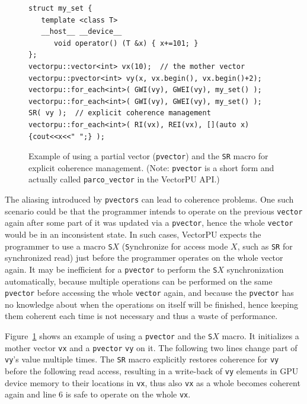 \begin{figure}
\noindent 
\begin{minipage}{\linewidth}
\begin{footnotesize}%
\begin{verbatim}
struct my_set {
   template <class T>
   __host__ __device__
      void operator() (T &x) { x+=101; } 
};
vectorpu::vector<int> vx(10);  // the mother vector
vectorpu::pvector<int> vy(x, vx.begin(), vx.begin()+2);
vectorpu::for_each<int>( GWI(vy), GWEI(vy), my_set() );
vectorpu::for_each<int>( GWI(vy), GWEI(vy), my_set() );
SR( vy );  // explicit coherence management
vectorpu::for_each<int>( RI(vx), REI(vx), [](auto x) {cout<<x<<" ";} );  
\end{verbatim}
\end{footnotesize}
\end{minipage}
\caption{\label{fig:pvector}Example of using a partial vector (\texttt{pvector}) and the \texttt{SR} macro for explicit coherence management. (Note: \texttt{pvector} is a short form and actually called \texttt{parco\_vector} in the VectorPU API.)}
\end{figure}

The aliasing introduced by \texttt{pvectors} can lead to coherence problems. One such scenario could be that the
programmer intends to operate on the previous \texttt{vector} again after
some part of it was updated via a \texttt{pvector}, 
hence the whole \texttt{vector} would be in an inconsistent state.
In such cases, VectorPU expects the programmer to use a macro \texttt{S$X$} (\texttt{S}ynchronize for access mode $X$,
such as \verb.SR. for synchronized read)
just before the programmer operates on the whole vector again.
It may be inefficient for a \texttt{pvector} to perform the \texttt{S$X$} synchronization
automatically, because multiple operations can be performed on the same \texttt{pvector} 
before accessing the whole \texttt{vector} again, 
and because the \texttt{pvector}
has no knowledge about when the operations on itself will be finished, hence
keeping them coherent each time is not necessary and thus a waste of performance.

Figure~\ref{fig:pvector}
shows an example of using a \texttt{pvector} and the 
\texttt{S$X$} macro.
It initializes a mother vector \texttt{vx}
and a \texttt{pvector} \texttt{vy} on it.
The following two lines change part of \texttt{vy}'s value multiple times. %
The \texttt{SR} macro explicitly restores coherence for
\texttt{vy} before the following read access, 
resulting in a write-back of \texttt{vy} elements in GPU device memory
to their locations in \texttt{vx},
thus also \texttt{vx} as a whole becomes coherent again
and line 6 is safe to operate on the whole \texttt{vx}.

